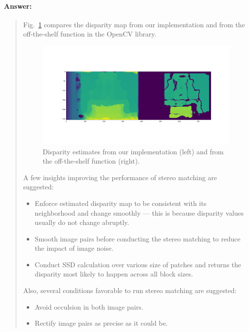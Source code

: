 \documentclass[11pt]{article}
\begin{document}
\paragraph{Answer:} 
\begin{quote}

Fig.~\ref{fig:disparity_comparison} compares the disparity map from our implementation and from the off-the-shelf function in the OpenCV library.

\begin{figure}[h]
    \centering
    \includegraphics[width=1.0\linewidth]{disparity_comparison.png}
    \caption{Disparity estimates from our implementation (left) and from the off-the-shelf function (right).}
    \label{fig:disparity_comparison}
\end{figure}

A few insights improving the performance of stereo matching are suggested:
\begin{itemize}
    \item Enforce estimated disparity map to be consistent with its neighborhood and change smoothly --- this is because disparity values usually do not change abruptly.
    \item Smooth image pairs before conducting the stereo matching to reduce the impact of image noise.
    \item Conduct SSD calculation over various size of patches and returns the disparity most likely to happen across all block sizes.
\end{itemize}


Also, several conditions favorable to run stereo matching are suggested:
\begin{itemize}
    \item Avoid occulsion in both image pairs.
    \item Rectify image pairs as precise as it could be.
\end{itemize}


\end{quote}
\end{document}
